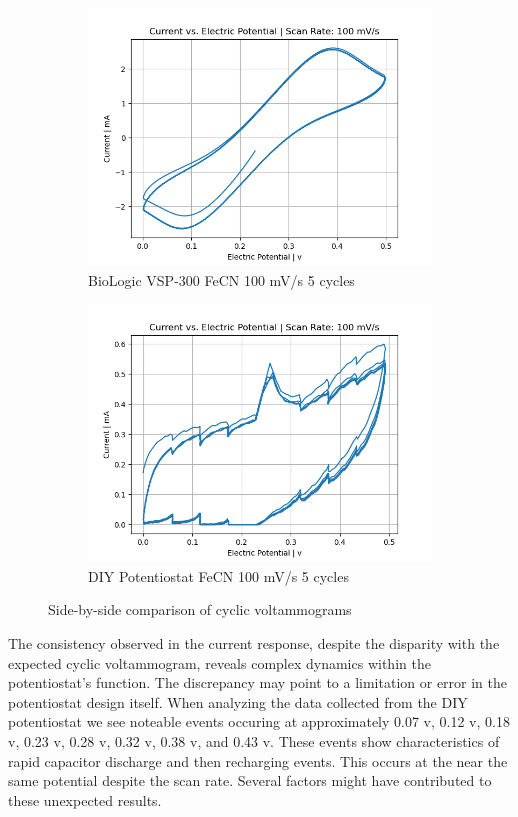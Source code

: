 \documentclass{article}
\begin{document}
\begin{figure}[H]
\begin{subfigure}[b]{0.45\textwidth}
\includegraphics[width=\textwidth]{FECN_100mVs_5cycles_lab.png}
\caption{BioLogic VSP-300 FeCN 100 mV/s 5 cycles}
\end{subfigure}
\hfill
\begin{subfigure}[b]{0.45\textwidth}
\includegraphics[width=\textwidth]{FECN_100mVs_5cycles.png}
\caption{DIY Potentiostat FeCN 100 mV/s 5 cycles}
\end{subfigure}
\caption{Side-by-side comparison of cyclic voltammograms}
\end{figure}


The consistency observed in the current response, despite the disparity with the expected cyclic voltammogram, reveals complex dynamics within the potentiostat's function. The discrepancy may point to a limitation or error in the potentiostat design itself. When analyzing the data collected from the DIY potentiostat we see noteable events occuring at approximately 0.07 v, 0.12 v, 0.18 v, 0.23 v, 0.28 v, 0.32 v, 0.38 v, and 0.43 v. These events show characteristics of rapid capacitor discharge and then recharging events. This occurs at the near the same potential despite the scan rate. Several factors might have contributed to these unexpected results.
\end{document}
